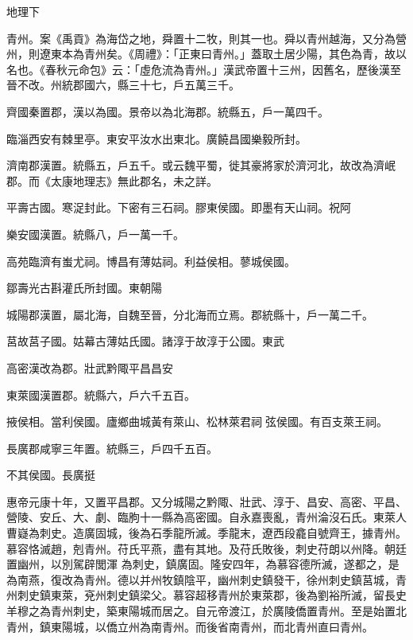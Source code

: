 
\begin{pinyinscope}
地理下



 青州。案《禹貢》為海岱之地，舜置十二牧，則其一也。舜以青州越海，又分為營州，則遼東本為青州矣。《周禮》：「正東曰青州。」蓋取土居少陽，其色為青，故以名也。《春秋元命包》云：「虛危流為青州。」漢武帝置十三州，因舊名，歷後漢至晉不改。州統郡國六，縣三十七，戶五萬三千。



 齊國秦置郡，漢以為國。景帝以為北海郡。統縣五，戶一萬四千。



 臨淄西安有棘里亭。東安平汝水出東北。廣饒昌國樂毅所封。



 濟南郡漢置。統縣五，戶五千。或云魏平蜀，徙其豪將家於濟河北，故改為濟岷郡。而《太康地理志》無此郡名，未之詳。



 平壽古國。寒浞封此。下密有三石祠。膠東侯國。即墨有天山祠。祝阿



 樂安國漢置。統縣八，戶一萬一千。



 高苑臨濟有蚩尤祠。博昌有薄姑祠。利益侯相。蓼城侯國。



 鄒壽光古斟灌氏所封國。東朝陽



 城陽郡漢置，屬北海，自魏至晉，分北海而立焉。郡統縣十，戶一萬二千。



 莒故莒子國。姑幕古薄姑氏國。諸淳于故淳于公國。東武



 高密漢改為郡。壯武黔陬平昌昌安



 東萊國漢置郡。統縣六，戶六千五百。



 掖侯相。當利侯國。廬鄉曲城黃有萊山、松林萊君祠弦侯國。有百支萊王祠。



 長廣郡咸寧三年置。統縣三，戶四千五百。



 不其侯國。長廣挺



 惠帝元康十年，又置平昌郡。又分城陽之黔陬、壯武、淳于、昌安、高密、平昌、營陵、安丘、大、劇、臨朐十一縣為高密國。自永嘉喪亂，青州淪沒石氏。東萊人曹嶷為刺史。造廣固城，後為石季龍所滅。季龍末，遼西段龕自號齊王，據青州。慕容恪滅趙，剋青州。苻氏平燕，盡有其地。及苻氏敗後，刺史苻朗以州降。朝廷置幽州，以別駕辟閭渾
 為刺史，鎮廣固。隆安四年，為慕容德所滅，遂都之，是為南燕，復改為青州。德以并州牧鎮陰平，幽州刺史鎮發干，徐州刺史鎮莒城，青州刺史鎮東萊，兗州刺史鎮梁父。慕容超移青州於東萊郡，後為劉裕所滅，留長史羊穆之為青州刺史，築東陽城而居之。自元帝渡江，於廣陵僑置青州。至是始置北青州，鎮東陽城，以僑立州為南青州。而後省南青州，而北青州直曰青州。




\end{pinyinscope}

